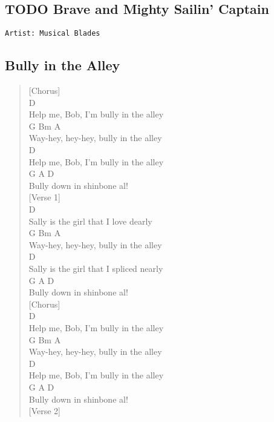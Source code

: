 \documentclass[11pt]{article}
\begin{document}
\subsection{{\bfseries\sffamily TODO} Brave and Mighty Sailin' Captain}
\label{sec:org749136e}
\begin{verbatim}
Artist: Musical Blades
\end{verbatim}
\clearpage
\subsection{Bully in the Alley}
\label{sec:org5bf9854}
\begin{verse}
[Chorus]\\
D\\
Help me, Bob, I'm bully in the alley\\
G        Bm       A\\
Way-hey, hey-hey, bully in the alley\\
D\\
Help me, Bob, I'm bully in the alley\\
G             A        D\\
Bully down in shinbone al!\\
\vspace*{1em}
[Verse 1]\\
D\\
Sally is the girl that I love dearly\\
G        Bm       A\\
Way-hey, hey-hey, bully in the alley\\
D\\
Sally is the girl that I spliced nearly\\
G             A        D\\
Bully down in shinbone al!\\
\vspace*{1em}
[Chorus]\\
D\\
Help me, Bob, I'm bully in the alley\\
G        Bm       A\\
Way-hey, hey-hey, bully in the alley\\
D\\
Help me, Bob, I'm bully in the alley\\
G             A        D\\
Bully down in shinbone al!\\
\vspace*{1em}
[Verse 2]\\

\end{verse}
\end{document}
